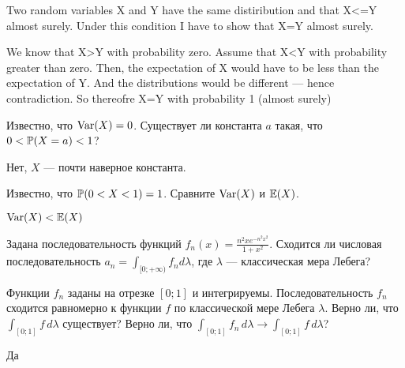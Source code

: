 \begin{problem}
Two random variables X and Y have the same distiribution and that X<=Y almost surely.
Under this condition I have to show that X=Y almost surely.

\begin{sol}

We know that X>Y with probability zero. Assume that X<Y with probability greater than zero. Then, the expectation of X would have to be less than the expectation of Y. And the distributions would be different — hence contradiction. So thereofre X=Y with probability 1 (almost surely)
\end{sol}
\end{problem}

\begin{problem}
Известно, что $\Var(X)=0$. Существует ли константа $a$ такая, что $0<\P(X=a)<1$?

\begin{sol}
Нет, $X$ — почти наверное константа.
\end{sol}
\end{problem}

\begin{problem}
Известно, что $\P(0<X<1)=1$. Сравните $\Var(X)$ и $\E(X)$.

\begin{sol}
$\Var(X)<\E(X)$
\end{sol}
\end{problem}

\begin{problem}
Задана последовательность функций $f_n(x)=\frac{n^2 x e^{-n^2 x^2}}{1+x^2}$. Сходится ли числовая последовательность $a_n=\int_{[0;+\infty)}f_n d\lambda$, где $\lambda$ — классическая мера Лебега?

\begin{sol}

\end{sol}
\end{problem}

\begin{problem}
Функции $f_n$ заданы на отрезке $[0;1]$ и интегрируемы. Последовательность $f_n$ сходится равномерно к функции $f$ по классической мере Лебега $\lambda$. Верно ли, что $\int_{[0;1]} f\,d\lambda$ существует? Верно ли, что $\int_{[0;1]} f_n\,d\lambda\to \int_{[0;1]} f\,d\lambda$?

\begin{sol}
Да
\end{sol}
\end{problem}

